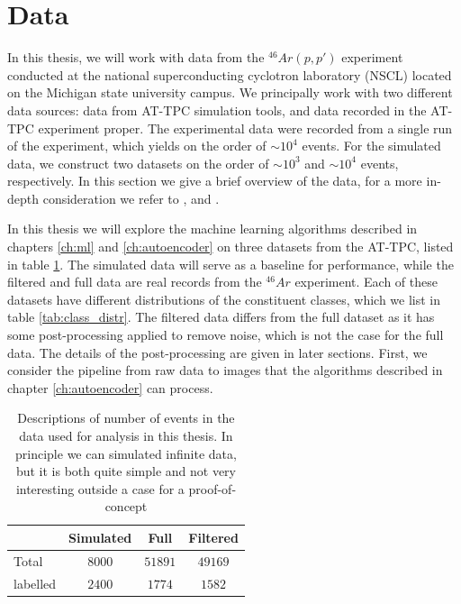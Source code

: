 \section{Data}\label{sec:data}

In this thesis, we will work with data from the ${}^{46}Ar(p, p')$ experiment conducted at the national superconducting cyclotron laboratory (NSCL) located on the Michigan state university campus. We principally work with two different data sources: data from AT-TPC simulation tools, and data recorded in the AT-TPC experiment proper. The experimental data were recorded from a single run of the experiment, which yields on the order of $\sim 10^4$ events.    For the simulated data, we construct two datasets on the order of $\sim10^3$ and $\sim10^4$ events, respectively. In this section we give a brief overview of the data, for a more in-depth consideration we refer to \cite{Mittig2015}, \cite{Suzuki2012} and  \cite{Bradt2017a}. 

In this thesis we will explore the machine learning algorithms described in chapters \ref{ch:ml} and \ref{ch:autoencoder} on three datasets from the AT-TPC, listed in table \ref{tab:datasets}. The simulated data will serve as a baseline for performance, while the filtered and full data are real records from the ${}^{46}Ar$ experiment. Each of these datasets have different distributions of the constituent classes, which we list in table \ref{tab:class_distr}. The filtered data differs from the full dataset as it has some post-processing applied to remove noise, which is not the case for the full data. The details of the post-processing are given in later sections. First, we consider the pipeline from raw data to images that the algorithms described in chapter \ref{ch:autoencoder} can process. 

\begin{table}[H]
\centering
\caption{Descriptions of number of events in the data used for analysis in this thesis. In principle we can simulated infinite data, but it is both quite simple and not very interesting outside a case for a proof-of-concept}\label{tab:datasets}
\begin{tabular}{lccc}
\toprule
{} & Simulated & Full & Filtered \\
\midrule
Total &  $8000$ & $51891$ & $49169$ \\
labelled & $2400$ & $1774$ &  $1582$ \\ 
\bottomrule
\end{tabular}
\end{table}


